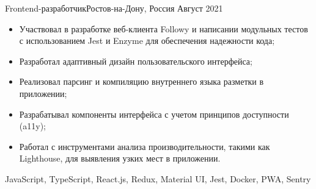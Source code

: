 
\begin{experiences}
   {Frontend-разработчик}{}{Ростов-на-Дону, Россия}
    {Август 2021}  {
                     \begin{itemize}
                     \item Участвовал в разработке веб-клиента Followy и написании модульных тестов с \mbox{использованием} Jest и Enzyme для обеспечения надежности кода;
                     \item Разработал адаптивный дизайн пользовательского интерфейса;
                     \item Реализовал парсинг и компиляцию внутреннего языка разметки в приложении;
                     \item Разрабатывал компоненты интерфейса с учетом принципов доступности (a11y);
                     \item Работал с инструментами анализа производительности, такими как Lighthouse, для выявления узких мест в приложении.
                     \end{itemize}
                  }
                  {JavaScript, TypeScript, React.js, Redux, Material UI, Jest, Docker, PWA, Sentry}
\end{experiences}
